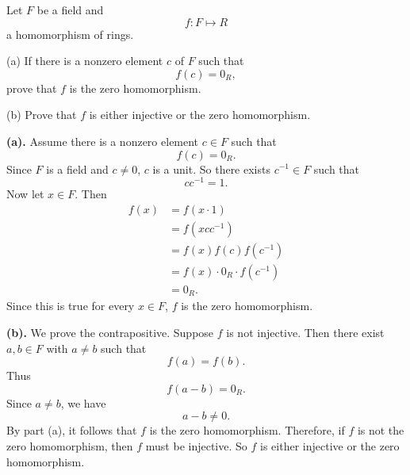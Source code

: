 \begin{problem}{
    Let $F$ be a field and
    \[
        f:F\mapsto R
    \]
    a homomorphism of rings.

    (a) If there is a nonzero element $c$ of $F$ such that
    \[
        f(c)=0_R,
    \]
    prove that $f$ is the zero homomorphism.

    (b) Prove that $f$ is either injective or the zero homomorphism.
}
    \textbf{(a).}
    Assume there is a nonzero element $c\in F$ such that
    \[
        f(c)=0_R.
    \]
    Since $F$ is a field and $c\neq 0$, $c$ is a unit.
    So there exists $c^{-1}\in F$ such that
    \[
        cc^{-1}=1.
    \]
    Now let $x\in F$.
    Then
    \begin{align*}
        f(x)
        &=
        f(x\cdot 1)\\
        &=
        f(xcc^{-1})\\
        &=
        f(x)f(c)f(c^{-1})\\
        &=
        f(x)\cdot 0_R\cdot f(c^{-1})\\
        &=
        0_R.
    \end{align*}
    Since this is true for every $x\in F$, $f$ is the zero homomorphism.

    \textbf{(b).}
    We prove the contrapositive.
    Suppose $f$ is not injective.
    Then there exist $a,b\in F$ with $a\neq b$ such that
    \[
        f(a)=f(b).
    \]
    Thus
    \[
        f(a-b)=0_R.
    \]
    Since $a\neq b$, we have
    \[
        a-b\neq 0.
    \]
    By part (a), it follows that $f$ is the zero homomorphism.
    Therefore, if $f$ is not the zero homomorphism, then $f$ must be injective.
    So $f$ is either injective or the zero homomorphism.
\end{problem}

